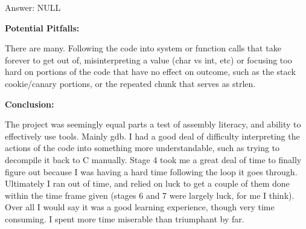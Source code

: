 \documentclass{article}
\begin{document}
    \bigskip

    Answer: NULL

    \bigskip


    \textbf{Potential Pitfalls:}

    There are many. Following the code into system or function calls that take forever to get out of, misinterpreting a value (char vs int, etc) or focusing too hard on portions of the code that have no effect on outcome, such as the stack cookie/canary portions, or the repeated chunk that serves as strlen.

    \bigskip

    \textbf{Conclusion:}

    The project was seemingly equal parts a test of assembly literacy, and ability to effectively use tools. Mainly gdb. I had a good deal of difficulty interpreting the actions of the code into something more understandable, such as trying to decompile it back to C manually. Stage 4 took me a great deal of time to finally figure out because I was having a hard time following the loop it goes through. Ultimately I ran out of time, and relied on luck to get a couple of them done within the time frame given (stages 6 and 7 were largely luck, for me I think).
    Over all I would say it was a good learning experience, though very time consuming. I spent more time miserable than triumphant by far.
\end{document}
